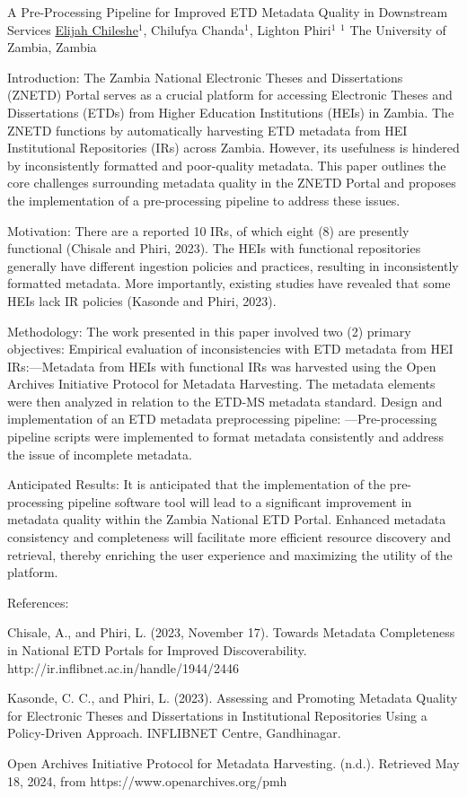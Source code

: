 
    \begin{abstract_online}{A Pre-Processing Pipeline for Improved ETD Metadata Quality in Downstream Services}{%
    \underline{Elijah Chileshe}$^{1}$, Chilufya Chanda$^{1}$, Lighton Phiri$^{1}$}{%
    }{%
    $^1$ The University of Zambia, Zambia
}

Introduction: The Zambia National Electronic Theses and Dissertations (ZNETD) Portal serves as a crucial platform for accessing Electronic Theses and Dissertations (ETDs) from Higher Education Institutions (HEIs) in Zambia. The ZNETD functions by automatically harvesting ETD metadata from HEI Institutional Repositories (IRs) across Zambia. However, its usefulness is hindered by inconsistently formatted and poor-quality metadata. This paper outlines the core challenges surrounding metadata quality in the ZNETD Portal and proposes the implementation of a pre-processing pipeline to address these issues.

Motivation: There are a reported 10 IRs, of which eight (8) are presently functional (Chisale and Phiri, 2023). The HEIs with functional repositories generally have different ingestion policies and practices, resulting in inconsistently formatted metadata. More importantly, existing studies have revealed that some HEIs lack IR policies (Kasonde and Phiri, 2023).

Methodology: The work presented in this paper involved two (2) primary objectives:
Empirical evaluation of inconsistencies with ETD metadata from HEI IRs:—Metadata from HEIs with functional IRs was harvested using the Open Archives Initiative Protocol for Metadata Harvesting. The metadata elements were then analyzed in relation to the ETD-MS metadata standard.
Design and implementation of an ETD metadata preprocessing pipeline: —Pre-processing pipeline scripts were implemented to format metadata consistently and address the issue of incomplete metadata.

Anticipated Results: It is anticipated that the implementation of the pre-processing pipeline software tool will lead to a significant improvement in metadata quality within the Zambia National ETD Portal. Enhanced metadata consistency and completeness will facilitate more efficient resource discovery and retrieval, thereby enriching the user experience and maximizing the utility of the platform.

References:

Chisale, A., and Phiri, L. (2023, November 17). Towards Metadata Completeness in National ETD Portals for Improved Discoverability. http://ir.inflibnet.ac.in/handle/1944/2446

Kasonde, C. C., and Phiri, L. (2023). Assessing and Promoting Metadata Quality for Electronic Theses and Dissertations in Institutional Repositories Using a Policy-Driven Approach. INFLIBNET Centre, Gandhinagar.

Open Archives Initiative Protocol for Metadata Harvesting. (n.d.). Retrieved May 18, 2024, from https://www.openarchives.org/pmh

\end{abstract_online}

